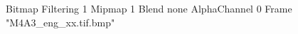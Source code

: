 {Bitmap
	{Filtering 1}
	{Mipmap 1}
	{Blend none}
	{AlphaChannel 0}
	{Frame "M4A3_eng_xx.tif.bmp"}
}
